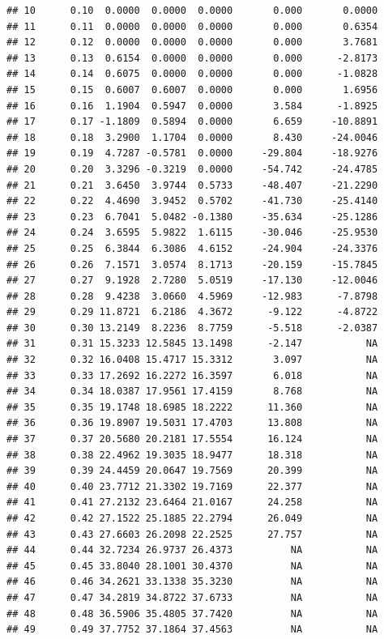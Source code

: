 \documentclass{article}\usepackage[]{graphicx}\usepackage[]{color}
\makeatletter
\newenvironment{kframe}{%
 \def\at@end@of@kframe{}%
 \ifinner\ifhmode%
  \def\at@end@of@kframe{\end{minipage}}%
  \begin{minipage}{\columnwidth}%
 \fi\fi%
 \def\FrameCommand##1{\hskip\@totalleftmargin \hskip-\fboxsep
 \colorbox{shadecolor}{##1}\hskip-\fboxsep
     \hskip-\linewidth \hskip-\@totalleftmargin \hskip\columnwidth}%
 \MakeFramed {\advance\hsize-\width
   \@totalleftmargin\z@ \linewidth\hsize
   \@setminipage}}%
 {\par\unskip\endMakeFramed%
 \at@end@of@kframe}
\newenvironment{knitrout}{}{} %
\makeatother
\begin{document}
\begin{knitrout}
\begin{kframe}
\begin{verbatim}
## 10      0.10  0.0000  0.0000  0.0000       0.000       0.0000
## 11      0.11  0.0000  0.0000  0.0000       0.000       0.6354
## 12      0.12  0.0000  0.0000  0.0000       0.000       3.7681
## 13      0.13  0.6154  0.0000  0.0000       0.000      -2.8173
## 14      0.14  0.6075  0.0000  0.0000       0.000      -1.0828
## 15      0.15  0.6007  0.6007  0.0000       0.000       1.6956
## 16      0.16  1.1904  0.5947  0.0000       3.584      -1.8925
## 17      0.17 -1.1809  0.5894  0.0000       6.659     -10.8891
## 18      0.18  3.2900  1.1704  0.0000       8.430     -24.0046
## 19      0.19  4.7287 -0.5781  0.0000     -29.804     -18.9276
## 20      0.20  3.3296 -0.3219  0.0000     -54.742     -24.4785
## 21      0.21  3.6450  3.9744  0.5733     -48.407     -21.2290
## 22      0.22  4.4690  3.9452  0.5702     -41.730     -25.4140
## 23      0.23  6.7041  5.0482 -0.1380     -35.634     -25.1286
## 24      0.24  3.6595  5.9822  1.6115     -30.046     -25.9530
## 25      0.25  6.3844  6.3086  4.6152     -24.904     -24.3376
## 26      0.26  7.1571  3.0574  8.1713     -20.159     -15.7845
## 27      0.27  9.1928  2.7280  5.0519     -17.130     -12.0046
## 28      0.28  9.4238  3.0660  4.5969     -12.983      -7.8798
## 29      0.29 11.8721  6.2186  4.3672      -9.122      -4.8722
## 30      0.30 13.2149  8.2236  8.7759      -5.518      -2.0387
## 31      0.31 15.3233 12.5845 13.1498      -2.147           NA
## 32      0.32 16.0408 15.4717 15.3312       3.097           NA
## 33      0.33 17.2692 16.2272 16.3597       6.018           NA
## 34      0.34 18.0387 17.9561 17.4159       8.768           NA
## 35      0.35 19.1748 18.6985 18.2222      11.360           NA
## 36      0.36 19.8907 19.5031 17.4703      13.808           NA
## 37      0.37 20.5680 20.2181 17.5554      16.124           NA
## 38      0.38 22.4962 19.3035 18.9477      18.318           NA
## 39      0.39 24.4459 20.0647 19.7569      20.399           NA
## 40      0.40 23.7712 21.3302 19.7169      22.377           NA
## 41      0.41 27.2132 23.6464 21.0167      24.258           NA
## 42      0.42 27.1522 25.1885 22.2794      26.049           NA
## 43      0.43 27.6603 26.2098 22.2525      27.757           NA
## 44      0.44 32.7234 26.9737 26.4373          NA           NA
## 45      0.45 33.8040 28.1001 30.4370          NA           NA
## 46      0.46 34.2621 33.1338 35.3230          NA           NA
## 47      0.47 34.2819 34.8722 37.6733          NA           NA
## 48      0.48 36.5906 35.4805 37.7420          NA           NA
## 49      0.49 37.7752 37.1864 37.4563          NA           NA

\end{verbatim}
\end{kframe}
\end{knitrout}
\end{document}
